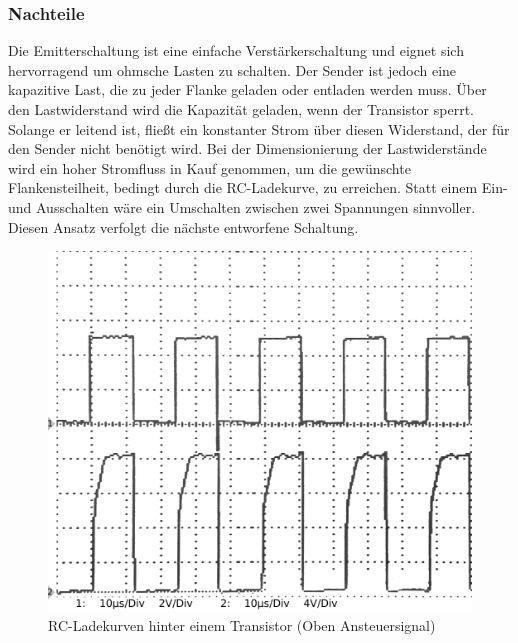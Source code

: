 \subsubsection{Nachteile}
Die Emitterschaltung ist eine einfache Verstärkerschaltung und eignet sich hervorragend um ohmsche Lasten zu schalten. Der Sender ist jedoch eine kapazitive Last, die zu jeder Flanke geladen oder entladen werden muss. Über den Lastwiderstand wird die Kapazität geladen, wenn der Transistor sperrt. Solange er leitend ist, fließt ein konstanter Strom über diesen Widerstand, der für den Sender nicht benötigt wird. Bei der Dimensionierung der Lastwiderstände wird ein hoher Stromfluss in Kauf genommen, um die gewünschte Flankensteilheit, bedingt durch die RC-Ladekurve, zu erreichen. Statt einem Ein- und Ausschalten wäre ein Umschalten zwischen zwei Spannungen sinnvoller. Diesen Ansatz verfolgt die nächste entworfene Schaltung.

\begin{figure}[H]
\centering
\includegraphics[width=(\textwidth)]{oszi/15-04-01/2.png}
\caption{RC-Ladekurven hinter einem Transistor (Oben Ansteuersignal)} \label{img:I4}
\end{figure}

